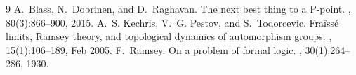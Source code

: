 \documentclass[10pt,a4paper]{article}
\theoremstyle{plain}
\theoremstyle{definition}
\begin{document}
\begin{thebibliography}{9}
A.~Blass, N.~Dobrinen, and D.~Raghavan.
\newblock The next best thing to a {P}-point.
, 80(3):866–900, 2015.
A.~S. Kechris, V.~G. Pestov, and S.~Todorcevic.
\newblock Fra{\"i}ss{\'e} limits, {R}amsey theory, and topological dynamics of
  automorphism groups.
, 15(1):106--189, Feb
  2005.
F.~Ramsey.
\newblock On a problem of formal logic.
, 30(1):264--286, 1930.
\end{thebibliography}
\end{document}

